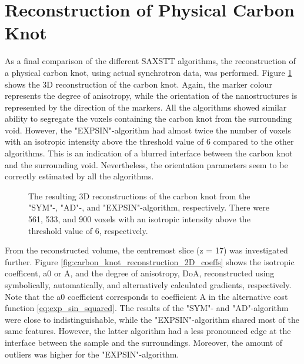 \clearpage
\section{Reconstruction of Physical Carbon Knot}\label{sec:reconstruction_physical_carbon_knot}

As a final comparison of the different SAXSTT algorithms, the reconstruction of a physical carbon knot, using actual synchrotron data, was performed.
Figure \ref{fig:carbon_knot_reconstruction_3D} shows the 3D reconstruction of the carbon knot.
Again, the marker colour represents the degree of anisotropy, while the orientation of the nanostructures is represented by the direction of the markers.
All the algorithms showed similar ability to segregate the voxels containing the carbon knot from the surrounding void.
However, the "EXPSIN"-algorithm had almost twice the number of voxels with an isotropic intensity above the threshold value of 6 compared to the other algorithms.
This is an indication of a blurred interface between the carbon knot and the surrounding void.
Nevertheless, the orientation parameters seem to be correctly estimated by all the algorithms.

\clearpage

\begin{figure}[h!]
    \centering
    
    \caption{ The resulting 3D reconstructions of the carbon knot from the "SYM"-, "AD"-, and "EXPSIN"-algorithm, respectively.
        There were 561, 533, and 900 voxels with an isotropic intensity above the threshold value of 6, respectively.
    }
    \label{fig:carbon_knot_reconstruction_3D}
\end{figure}

\clearpage

From the reconstructed volume, the centremost slice (z = 17) was investigated further.
Figure \ref{fig:carbon_knot_reconstruction_2D_coeffs} shows the isotropic coefficent, a0 or A, and the degree of anisotropy, DoA, reconstructed using symbolically, automatically, and alternatively calculated gradients, respectively.
Note that the a0 coefficient corresponds to coefficient A in the alternative cost function \eqref{eq:exp_sin_squared}.
The results of the "SYM"- and "AD"-algorithm were close to indistinguishable,
while the "EXPSIN"-algorithm shared most of the same features.
However, the latter algorithm had a less pronounced edge at the interface between the sample and the surroundings.
Moreover, the amount of outliers was higher for the "EXPSIN"-algorithm.

